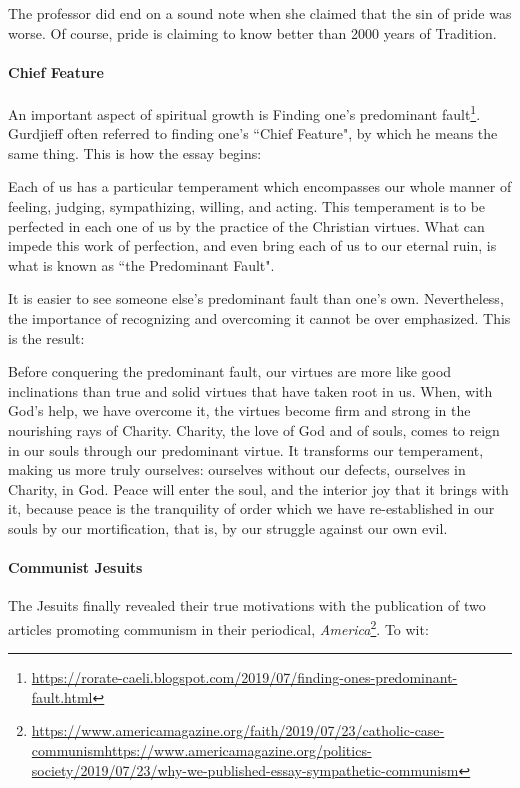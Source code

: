 The professor did end on a sound note when she claimed that the sin of pride was worse. Of course, pride is claiming to know better than 2000 years of Tradition.

\paragraph{Chief Feature}
An important aspect of spiritual growth is Finding one's predominant fault\footnote{\url{https://rorate-caeli.blogspot.com/2019/07/finding-ones-predominant-fault.html}}. Gurdjieff often referred to finding one's ``Chief Feature", by which he means the same thing. This is how the essay begins:

\begin{quotex}
Each of us has a particular temperament which encompasses our whole manner of feeling, judging, sympathizing, willing, and acting. This temperament is to be perfected in each one of us by the practice of the Christian virtues. What can impede this work of perfection, and even bring each of us to our eternal ruin, is what is known as ``the Predominant Fault". 

\end{quotex}
It is easier to see someone else's predominant fault than one's own. Nevertheless, the importance of recognizing and overcoming it cannot be over emphasized. This is the result:

\begin{quotex}
Before conquering the predominant fault, our virtues are more like good inclinations than true and solid virtues that have taken root in us. When, with God's help, we have overcome it, the virtues become firm and strong in the nourishing rays of Charity. Charity, the love of God and of souls, comes to reign in our souls through our predominant virtue. It transforms our temperament, making us more truly ourselves: ourselves without our defects, ourselves in Charity, in God. Peace will enter the soul, and the interior joy that it brings with it, because peace is the tranquility of order which we have re-established in our souls by our mortification, that is, by our struggle against our own evil. 

\end{quotex}
\paragraph{Communist Jesuits}
The Jesuits finally revealed their true motivations with the publication of two articles promoting communism in their periodical, \emph{America}\footnote{\url{https://www.americamagazine.org/faith/2019/07/23/catholic-case-communism}\newline\url{https://www.americamagazine.org/politics-society/2019/07/23/why-we-published-essay-sympathetic-communism}}. To wit:


